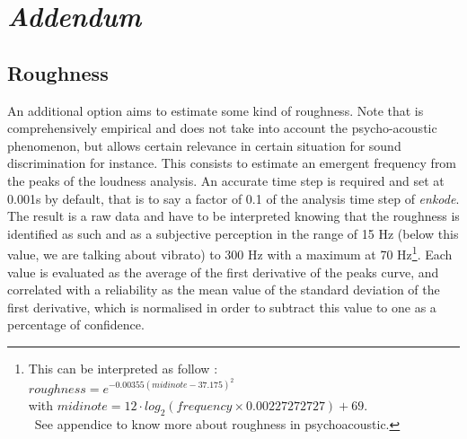 \section{\textit{Addendum}}
\subsection*{Roughness}

An additional option aims to estimate some kind of roughness. Note that is comprehensively empirical and does not take into account the psycho-acoustic phenomenon, but allows certain relevance in certain situation for sound discrimination for instance. This consists to estimate an emergent frequency from the peaks of the loudness analysis. An accurate time step is required and set at 0.001s by default, that is to say a factor of 0.1 of the analysis time step of \textsl{enkode}. The result is a raw data and have to be interpreted knowing that the roughness is identified as such and as a subjective perception in the range of 15 Hz (below this value, we are talking about vibrato) to 300 Hz with a maximum at 70 Hz\footnote{This can be interpreted as follow :\\ \indent \quad $roughness = e^{-0.00355 (midinote-37.175)^2}$\\ \indent \quad with $midinote=12 \cdot log_2(frequency \times 0.00227272727) + 69$.\\ \indent See appendice  to know more about roughness in psychoacoustic.}. Each value is evaluated as the average of the first derivative of the peaks curve, and correlated with a reliability as the mean value of the standard deviation of the first derivative, which is normalised in order to subtract this value to one as a percentage of confidence.
